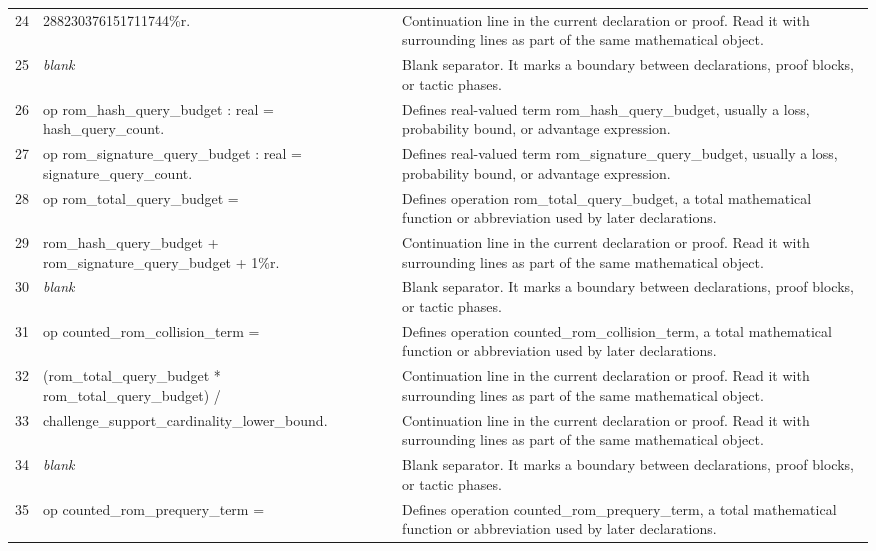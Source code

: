 \documentclass[10pt]{article}
\begin{document}
\begin{longtable}{r L{0.53\textwidth} L{0.37\textwidth}}
24 & {\ttfamily\scriptsize   288230376151711744\%r.} & Continuation line in the current declaration or proof.  Read it with surrounding lines as part of the same mathematical object. \\
25 & {\ttfamily\scriptsize \emph{blank}} & Blank separator.  It marks a boundary between declarations, proof blocks, or tactic phases. \\
26 & {\ttfamily\scriptsize op rom\_hash\_query\_budget : real = hash\_query\_count.} & Defines real-valued term rom\_hash\_query\_budget, usually a loss, probability bound, or advantage expression. \\
27 & {\ttfamily\scriptsize op rom\_signature\_query\_budget : real = signature\_query\_count.} & Defines real-valued term rom\_signature\_query\_budget, usually a loss, probability bound, or advantage expression. \\
28 & {\ttfamily\scriptsize op rom\_total\_query\_budget =} & Defines operation rom\_total\_query\_budget, a total mathematical function or abbreviation used by later declarations. \\
29 & {\ttfamily\scriptsize   rom\_hash\_query\_budget + rom\_signature\_query\_budget + 1\%r.} & Continuation line in the current declaration or proof.  Read it with surrounding lines as part of the same mathematical object. \\
30 & {\ttfamily\scriptsize \emph{blank}} & Blank separator.  It marks a boundary between declarations, proof blocks, or tactic phases. \\
31 & {\ttfamily\scriptsize op counted\_rom\_collision\_term =} & Defines operation counted\_rom\_collision\_term, a total mathematical function or abbreviation used by later declarations. \\
32 & {\ttfamily\scriptsize   (rom\_total\_query\_budget * rom\_total\_query\_budget) /} & Continuation line in the current declaration or proof.  Read it with surrounding lines as part of the same mathematical object. \\
33 & {\ttfamily\scriptsize     challenge\_support\_cardinality\_lower\_bound.} & Continuation line in the current declaration or proof.  Read it with surrounding lines as part of the same mathematical object. \\
34 & {\ttfamily\scriptsize \emph{blank}} & Blank separator.  It marks a boundary between declarations, proof blocks, or tactic phases. \\
35 & {\ttfamily\scriptsize op counted\_rom\_prequery\_term =} & Defines operation counted\_rom\_prequery\_term, a total mathematical function or abbreviation used by later declarations. \\

\end{longtable}
\end{document}
